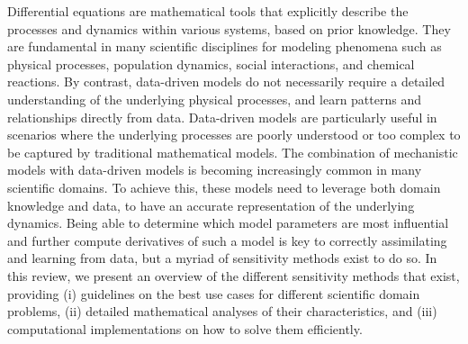 Differential equations are mathematical tools that explicitly describe the processes and dynamics within various systems, based on prior knowledge. 
They are fundamental in many scientific disciplines for modeling phenomena such as physical processes, population dynamics, social interactions, and chemical reactions.
By contrast, data-driven models do not necessarily require a detailed understanding of the underlying physical processes, and learn patterns and relationships directly from data. 
Data-driven models are particularly useful in scenarios where the underlying processes are poorly understood or too complex to be captured by traditional mathematical models.
The combination of mechanistic models with data-driven models is becoming increasingly common in many scientific domains. 
To achieve this, these models need to leverage both domain knowledge and data, to have an accurate representation of the underlying dynamics. 
Being able to determine which model parameters are most influential and further compute derivatives of such a model is key to correctly assimilating and learning from data, but a myriad of sensitivity methods exist to do so. 
In this review, we present an overview of the different sensitivity methods that exist, providing (i) guidelines on the best use cases for different scientific domain problems, (ii) detailed mathematical analyses of their characteristics, and (iii) computational implementations on how to solve them efficiently. 
